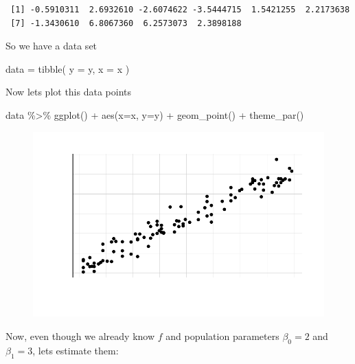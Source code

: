 \documentclass[
  letterpaper,
  DIV=11,
  numbers=noendperiod]{scrreprt}
\newenvironment{Shaded}{\begin{snugshade}}{\end{snugshade}}
\newcommand{\AttributeTok}[1]{\textcolor[rgb]{0.40,0.45,0.13}{#1}}
\newcommand{\FunctionTok}[1]{\textcolor[rgb]{0.28,0.35,0.67}{#1}}
\newcommand{\NormalTok}[1]{\textcolor[rgb]{0.00,0.23,0.31}{#1}}
\newcommand{\OtherTok}[1]{\textcolor[rgb]{0.00,0.23,0.31}{#1}}
\newcommand{\SpecialCharTok}[1]{\textcolor[rgb]{0.37,0.37,0.37}{#1}}
\begin{document}
\begin{verbatim}
 [1] -0.5910311  2.6932610 -2.6074622 -3.5444715  1.5421255  2.2173638
 [7] -1.3430610  6.8067360  6.2573073  2.3898188
\end{verbatim}

So we have a data set

\begin{Shaded}
\begin{Highlighting}[]
\NormalTok{data }\OtherTok{=} \FunctionTok{tibble}\NormalTok{(}
  \AttributeTok{y =}\NormalTok{ y, }\AttributeTok{x =}\NormalTok{ x}
\NormalTok{)}
\end{Highlighting}
\end{Shaded}

Now lets plot this data points

\begin{Shaded}
\begin{Highlighting}[]
\NormalTok{data }\SpecialCharTok{\%\textgreater{}\%} 
  \FunctionTok{ggplot}\NormalTok{() }\SpecialCharTok{+} \FunctionTok{aes}\NormalTok{(}\AttributeTok{x=}\NormalTok{x, }\AttributeTok{y=}\NormalTok{y) }\SpecialCharTok{+} \FunctionTok{geom\_point}\NormalTok{() }\SpecialCharTok{+} \FunctionTok{theme\_par}\NormalTok{()}
\end{Highlighting}
\end{Shaded}

\begin{figure}[H]

{\centering \includegraphics{Chapter3_files/figure-pdf/unnamed-chunk-13-1.pdf}

}

\end{figure}

Now, even though we already know \(f\) and population parameters
\(\beta_0 = 2\) and \(\beta_1 = 3\), lets estimate them:
\end{document}
